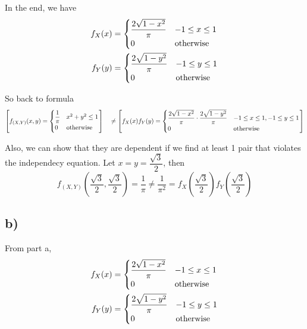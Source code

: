 \noindent In the end, we have
\begin{align*}
    f_X(x) &= \begin{cases}
                \dfrac{2\sqrt{1-x^2}}{\pi} &-1 \leq x \leq 1\\
                0 &\textnormal{otherwise}
            \end{cases}\\
    f_Y(y) &= \begin{cases}
                \dfrac{2\sqrt{1-y^2}}{\pi} &-1 \leq y \leq 1\\
                0 &\textnormal{otherwise}
            \end{cases}
\end{align*}

\noindent So back to formula
\begin{equation*}
    \left[ f_{(X, Y)}(x, y) = \begin{cases}
        \dfrac{1}{\pi} &x^2 + y^2 \leq 1\\
        0 &\textnormal{otherwise}
    \end{cases} \right]\
    \
    \
    \neq \left[ f_X(x) f_Y(y) = \begin{cases}
        \dfrac{2\sqrt{1-x^2}}{\pi} \cdot \dfrac{2\sqrt{1-y^2}}{\pi} &-1 \leq x \leq 1, -1 \leq y \leq 1\\
        0 &\textnormal{otherwise}
    \end{cases} \right]
\end{equation*}

\noindent Also, we can show that they are dependent if we find at least 1 pair that violates the independecy equation. Let $x = y = \dfrac{\sqrt{3}}{2}$, then
\begin{equation*}
    f_{(X, Y)}\left(\dfrac{\sqrt{3}}{2}, \dfrac{\sqrt{3}}{2}\right) = \frac{1}{\pi} \neq \frac{1}{\pi^2} = f_X\left(\dfrac{\sqrt{3}}{2}\right) f_Y\left(\dfrac{\sqrt{3}}{2}\right)
\end{equation*}

\subsection*{b)}

From part a,
\begin{align*}
    f_X(x) &= \begin{cases}
                \dfrac{2\sqrt{1-x^2}}{\pi} &-1 \leq x \leq 1\\
                0 &\textnormal{otherwise}
            \end{cases}\\
    f_Y(y) &= \begin{cases}
                \dfrac{2\sqrt{1-y^2}}{\pi} &-1 \leq y \leq 1\\
                0 &\textnormal{otherwise}
            \end{cases}
\end{align*}

